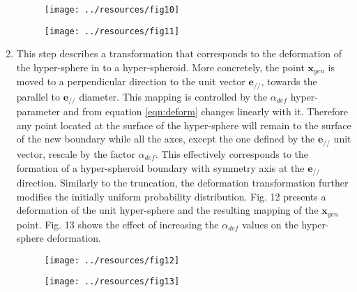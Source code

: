 \documentclass[parskip=full]{scrartcl}
\begin{document}
\begin{enumerate}
	\begin{figure}[H]
		\centering
		\texttt{[image: ../resources/fig10]}
	\end{figure}

	\begin{figure}[H]
		\centering
		\texttt{[image: ../resources/fig11]}
	\end{figure}

	\item This step describes a transformation that corresponds to the deformation of the hyper-sphere in to a hyper-spheroid. More concretely, the point \( \textbf{x}_{gen} \) is moved to a perpendicular direction to the unit vector \( \textbf{e}_{\scriptscriptstyle//} \), towards the parallel to \( \textbf{e}_{\scriptscriptstyle//} \) diameter. This mapping is controlled by the \( \alpha_{def} \) hyper-parameter and from equation \eqref{eqn:deform} changes linearly with it. Therefore any point located at the surface of the hyper-sphere will remain to the surface of the new boundary while all the axes, except the one defined by the \( \textbf{e}_{\scriptscriptstyle//} \) unit vector, rescale by the factor \( \alpha_{def} \). This effectively corresponds to the formation of a hyper-spheroid boundary with symmetry axis at the \( \textbf{e}_{\scriptscriptstyle//} \) direction. Similarly to the truncation, the deformation transformation further modifies the initially uniform probability distribution. Fig. 12 presents a deformation of the unit hyper-sphere and the resulting mapping of the \( \textbf{x}_{gen} \) point. Fig. 13 shows the effect of increasing the \( \alpha_{def} \) values on the hyper-sphere deformation.

	\begin{figure}[H]
		\centering
		\texttt{[image: ../resources/fig12]}
	\end{figure}
	
	\begin{figure}[H]
		\centering
		\texttt{[image: ../resources/fig13]}
	\end{figure}


\end{enumerate}
\end{document}
